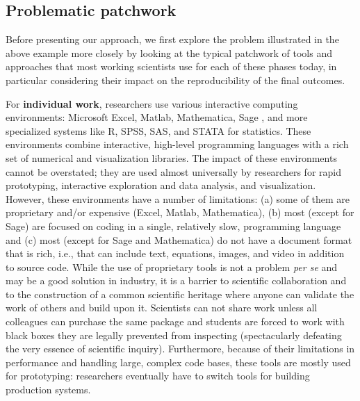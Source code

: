 \documentclass[ChapterTOCs,krantz2]{krantz} %
\begin{document}
\subsection{Problematic patchwork}

Before presenting our approach, we first explore the problem illustrated in the
above example more closely by looking at the typical patchwork of tools and
approaches that most working scientists use for each of these phases today, in
particular considering their impact on the reproducibility of the final
outcomes. 

For \textbf{individual work}, researchers use various interactive
computing environments: Microsoft Excel, Matlab, Mathematica\textregistered,
Sage \cite{sage}, and more specialized systems like R, SPSS, SAS, and STATA for
statistics. These environments combine interactive, high-level programming
languages with a rich set of numerical and visualization libraries. The impact
of these environments cannot be overstated; they are used almost universally by
researchers for rapid prototyping, interactive exploration and data analysis,
and visualization. However, these environments have a number of limitations:
(a) some of them are proprietary and/or expensive (Excel, Matlab, Mathematica),
(b) most (except for Sage) are focused on coding in a single, relatively slow,
programming language and (c) most (except for Sage and Mathematica) do not have
a document format that is rich, i.e., that can include text, equations, images,
and video in addition to source code. While the use of proprietary tools is not
a problem \emph{per se} and may be a good solution in industry, it is a barrier
to scientific collaboration and to the construction of a common scientific
heritage where anyone can validate the work of others and build upon it.
Scientists can not share work unless all colleagues can purchase the same
package and students are forced to work with black boxes they are legally
prevented from inspecting (spectacularly defeating the very essence of
scientific inquiry). Furthermore, because of their limitations in performance
and handling large, complex code bases, these tools are mostly used for
prototyping: researchers eventually have to switch tools for building
production systems.
\end{document}
